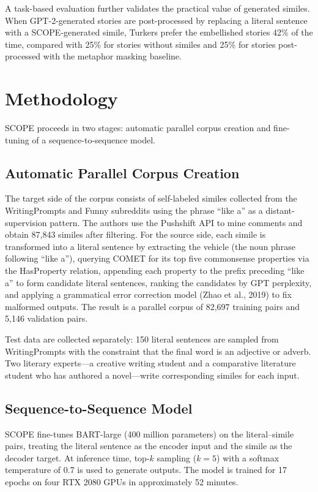 \documentclass[12pt]{article}
\begin{document}
A task-based evaluation further validates the practical value of generated similes. When GPT-2-generated stories are post-processed by replacing a literal sentence with a SCOPE-generated simile, Turkers prefer the embellished stories 42\% of the time, compared with 25\% for stories without similes and 25\% for stories post-processed with the metaphor masking baseline.

\section{Methodology}

SCOPE proceeds in two stages: automatic parallel corpus creation and fine-tuning of a sequence-to-sequence model.

\subsection{Automatic Parallel Corpus Creation}

The target side of the corpus consists of self-labeled similes collected from the WritingPrompts and Funny subreddits using the phrase ``like a'' as a distant-supervision pattern. The authors use the Pushshift API to mine comments and obtain 87,843 similes after filtering. For the source side, each simile is transformed into a literal sentence by extracting the vehicle (the noun phrase following ``like a''), querying COMET for its top five commonsense properties via the HasProperty relation, appending each property to the prefix preceding ``like a'' to form candidate literal sentences, ranking the candidates by GPT perplexity, and applying a grammatical error correction model (Zhao et al., 2019) to fix malformed outputs. The result is a parallel corpus of 82,697 training pairs and 5,146 validation pairs.

Test data are collected separately: 150 literal sentences are sampled from WritingPrompts with the constraint that the final word is an adjective or adverb. Two literary experts---a creative writing student and a comparative literature student who has authored a novel---write corresponding similes for each input.

\subsection{Sequence-to-Sequence Model}

SCOPE fine-tunes BART-large (400 million parameters) on the literal--simile pairs, treating the literal sentence as the encoder input and the simile as the decoder target. At inference time, top-$k$ sampling ($k=5$) with a softmax temperature of 0.7 is used to generate outputs. The model is trained for 17 epochs on four RTX 2080 GPUs in approximately 52 minutes.
\end{document}
